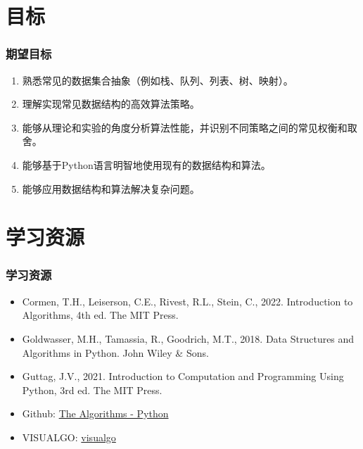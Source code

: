 \section{目标}

\begin{frame}
    \frametitle{期望目标}

    \begin{enumerate}
        \item 熟悉常见的数据集合抽象（例如栈、队列、列表、树、映射）。
        \item 理解实现常见数据结构的高效算法策略。
        \item 能够从理论和实验的角度分析算法性能，并识别不同策略之间的常见权衡和取舍。
        \item 能够基于Python语言明智地使用现有的数据结构和算法。
        \item 能够应用数据结构和算法解决复杂问题。
    \end{enumerate}

\end{frame}

\section{学习资源}

\begin{frame}
    \frametitle{学习资源}

    \begin{itemize}
        \item Cormen, T.H., Leiserson, C.E., Rivest, R.L., Stein, C., 2022. Introduction to Algorithms, 4th ed. The MIT Press.
        \item Goldwasser, M.H., Tamassia, R., Goodrich, M.T., 2018. Data Structures and Algorithms in Python. John Wiley \& Sons. \\ \vspace{\baselineskip}
        \item Guttag, J.V., 2021. Introduction to Computation and Programming Using Python, 3rd ed. The MIT Press. \\ \vspace{\baselineskip}
        \item Github: \href{https://github.com/TheAlgorithms}{The Algorithms - Python}
        \item VISUALGO: \href{https://visualgo.net/en}{visualgo}
    \end{itemize}

\end{frame}